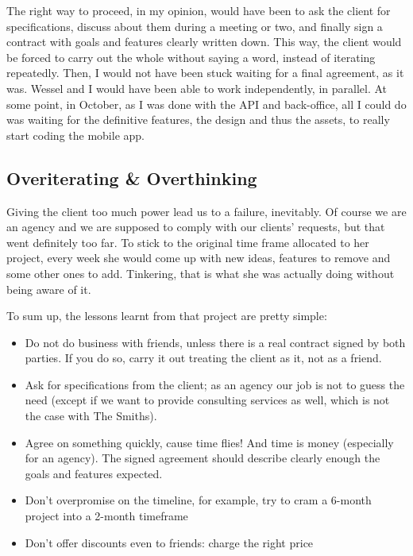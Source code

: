 \medskip

The right way to proceed, in my opinion, would have been to ask the client for specifications, discuss about them during a meeting or two, and finally sign a contract with goals and features clearly written down. This way, the client would be forced to carry out the whole without saying a word, instead of iterating repeatedly. Then, I would not have been stuck waiting for a final agreement, as it was. Wessel and I would have been able to work independently, in parallel. At some point, in October, as I was done with the API and back-office, all I could do was waiting for the definitive features, the design and thus the assets, to really start coding the mobile app.

\subsection{Overiterating \& Overthinking}

Giving the client too much power lead us to a failure, inevitably. Of course we are an agency and we are supposed to comply with our clients' requests, but that went definitely too far. To stick to the original time frame allocated to her project, every week she would come up with new ideas, features to remove and some other ones to add. Tinkering, that is what she was actually doing without being aware of it.

\medskip

To sum up, the lessons learnt from that project are pretty simple:

\begin{itemize}
  \item Do not do business with friends, unless there is a real contract signed by both parties. If you do so, carry it out treating the client as it, not as a friend.
  \item Ask for specifications from the client; as an agency our job is not to guess the need (except if we want to provide consulting services as well, which is not the case with The Smiths).
  \item Agree on something quickly, cause time flies! And time is money (especially for an agency). The signed agreement should describe clearly enough the goals and features expected.
  \item Don't overpromise on the timeline, for example, try to cram a 6-month project into a 2-month timeframe
  \item Don't offer discounts even to friends: charge the right price
\end{itemize}

